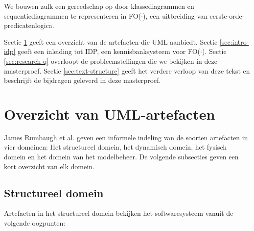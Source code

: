 We bouwen zulk een gereedschap op door klassediagrammen en sequentiediagrammen te representeren in FO($\cdot$), een uitbreiding van eerste-orde-predicatenlogica.

Sectie \ref{sec:uml-artifacts} geeft een overzicht van de artefacten die UML aanbiedt. Sectie \ref{sec:intro-idp} geeft een inleiding tot IDP\cite{DeCatBroes2014PLaa}, een kennisbanksysteem voor FO($\cdot$). Sectie \ref{sec:research-q} overloopt de probleemstellingen die we bekijken in deze masterproef. Sectie \ref{sec:text-structure} geeft het verdere verloop van deze tekst en beschrijft de bijdragen geleverd in deze masterproef.

\section{Overzicht van UML-artefacten}\label{sec:uml-artifacts}

James Rumbaugh et al.\cite{RumbaughJames2005Tuml} geven een informele indeling van de soorten artefacten in vier domeinen: Het structureel domein, het dynamisch domein, het fysisch domein en het domein van het modelbeheer. De volgende subsecties geven een kort overzicht van elk domein.

\subsection{Structureel domein}

Artefacten in het structureel domein bekijken het softwaresysteem vanuit de volgende oogpunten:

